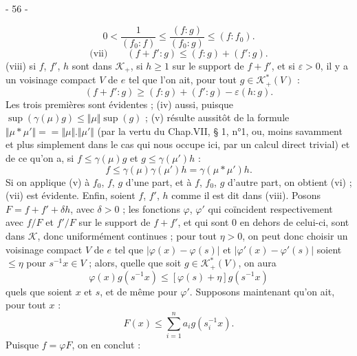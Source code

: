 
\begin{center}- 56 -\end{center}

\[
0<\frac{1}{(f_0:f)}\leq\frac{(f:g)}{(f_0:g)}\leq(f:f_0).
\]
\[
\text{(vii)}\qquad(f+f':g)\leq(f:g)+(f':g).
\]
(viii) si $f$, $f'$, $h$ sont dans $\mathcal{K}_+$, si $h\geq1$ sur le support de $f+f'$, et si $\varepsilon>0$, il y a un voisinage compact $V$ de $e$ tel que l'on ait, pour tout $g\in\mathcal{K}^*_+(V)$ :
\[
(f+f':g)\geq(f:g)+(f':g)-\varepsilon(h:g).
\]
Les trois premières sont évidentes ; (iv) aussi, puisque $\sup(\gamma(\mu)g)\leq\Vert\mu\Vert\sup(g)$ ; (v) résulte aussitôt de la formule $\Vert\mu*\mu'\Vert={} =\Vert\mu\Vert.\Vert\mu'\Vert$ (par la vertu du Chap.VII, § 1, n°1, ou, moins savamment et plus simplement dans le cas qui nous occupe ici, par un calcul direct trivial) et de ce qu'on a, si $f\leq\gamma(\mu)g$ et $g\leq\gamma(\mu')h$ :
\[
f\leq\gamma(\mu)\gamma(\mu')h=\gamma(\mu*\mu')h.
\]
Si on applique (v) à $f_0$, $f$, $g$ d'une part, et à $f$, $f_0$, $g$ d'autre part, on obtient (vi) ; (vii) est évidente. Enfin, soient $f$, $f'$, $h$ comme il est dit dans (viii). Posons $F=f+f'+\delta h$, avec $\delta>0$ ; les fonctions $\varphi$, $\varphi'$ qui coïncident respectivement avec $f/F$ et $f'/F$ sur le support de $f+f'$, et qui sont $0$ en dehors de celui-ci, sont dans $\mathcal{K}$, donc uniformément continues ; pour tout $\eta>0$, on peut donc choisir un voisinage compact $V$ de $e$ tel que $|\varphi(x)-\varphi(s)|$ et $|\varphi'(x)-\varphi'(s)|$ soient $\leq\eta$ pour $s^{-1}x\in V$ ; alors, quelle que soit $g\in\mathcal{K}^*_+(V)$, on aura
\[
\varphi(x)g(s^{-1}x)\leq[\varphi(s)+\eta]g(s^{-1}x)
\]
quels que soient $x$ et $s$, et de même pour $\varphi'$. Supposons maintenant qu'on ait, pour tout $x$ :
\[
F(x)\leq\sum_{i=1}^{n}a_i g(s_i^{-1}x).
\]
Puisque $f=\varphi F$, on en conclut :
